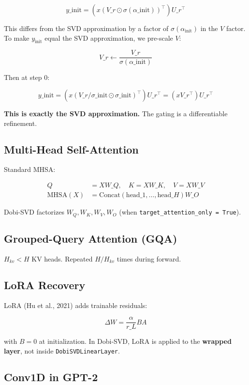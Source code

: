 \[
y\_\text{init} = (x (V\_r \odot \sigma(\alpha\_\text{init}))^\top) U\_r^\top
\tag{3.6}
\]

This differs from the SVD approximation by a factor of $\sigma(\alpha_\text{init})$ 
in the $V$ factor. To make $y_\text{init}$ equal the SVD approximation, 
we pre-scale $V$:

\[
V\_r \leftarrow \frac{V\_r}{\sigma(\alpha\_\text{init})}
\tag{3.7}
\]

Then at step 0:

\[
y\_\text{init} = (x (V\_r / \sigma\_\text{init} \odot \sigma\_\text{init})^\top) U\_r^\top = (x V\_r^\top) U\_r^\top
\tag{3.8}
\]

\textbf{This is exactly the SVD approximation.} The gating is a differentiable 
refinement.

\subsection{Multi-Head Self-Attention}

Standard MHSA:

\[
\begin{aligned}
Q &= X W\_Q, \quad K = X W\_K, \quad V = X W\_V \\
\text{MHSA}(X) &= \text{Concat}(\text{head}\_1, \dots, \text{head}\_H) W\_O
\end{aligned}
\tag{3.9}
\]

Dobi-SVD factorizes $W_Q, W_K, W_V, W_O$ (when \texttt{target\_attention\_only = True}).

\subsection{Grouped-Query Attention (GQA)}

$H_{kv} < H$ KV heads. Repeated $H / H_{kv}$ times during forward.

\subsection{LoRA Recovery}

LoRA (Hu et al., 2021) adds trainable residuals:

\[
\Delta W = \frac{\alpha}{r\_L} B A
\tag{3.10}
\]

with $B = 0$ at initialization. In Dobi-SVD, LoRA is applied to the 
\textbf{wrapped layer}, not inside \texttt{DobiSVDLinearLayer}.

\subsection{Conv1D in GPT-2}

